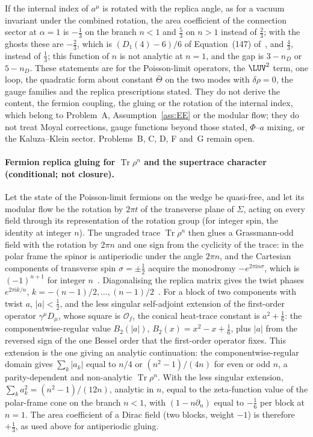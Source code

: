 If the internal index of \(a^\mu\) is rotated with the replica angle, as for a vacuum invariant under the combined rotation, the area coefficient of the connection sector at \(\alpha=1\) is \(-\tfrac13\) on the branch \(n<1\) and \(\tfrac53\) on \(n>1\) instead of \(\tfrac23\); with the ghosts these are \(-\tfrac23\), which is \((D_1(4)-6)/6\) of Equation~(147) of~\cite{Solodukhin2011}, and \(\tfrac43\), instead of \(\tfrac13\); this function of \(n\) is not analytic at \(n=1\), and the gap is \(3-n_D\) or \(5-n_D\). These statements are for the Poisson-limit operators, the \(\LUV^2\) term, one loop, the quadratic form about constant \(\bar\Theta\) on the two modes with \(\delta\rho=0\), the gauge families and the replica prescriptions stated. They do not derive the content, the fermion coupling, the gluing or the rotation of the internal index, which belong to Problem~A, Assumption~\ref{ass:EE} or the modular flow; they do not treat Moyal corrections, gauge functions beyond those stated, \(\Phi\)--\(a\) mixing, or the Kaluza--Klein sector. Problems~B, C, D, F and~G remain open.

\paragraph{Fermion replica gluing for \(\operatorname{Tr}\rho^n\) and the supertrace character (conditional; not closure).}
Let the state of the Poisson-limit fermions on the wedge be quasi-free, and let its modular flow be the rotation by \(2\pi t\) of the transverse plane of \(\Sigma\), acting on every field through its representation of the rotation group (for integer spin, the identity at integer \(n\)). The ungraded trace \(\operatorname{Tr}\rho^n\) then glues a Grassmann-odd field with the rotation by \(2\pi n\) and one sign from the cyclicity of the trace: in the polar frame the spinor is antiperiodic under the angle \(2\pi n\), and the Cartesian components of transverse spin \(\sigma=\pm\tfrac12\) acquire the monodromy \(-e^{2\pi\mathrm in\sigma}\), which is \((-1)^{n+1}\) for integer \(n\)~\cite{CasiniHuerta2009,FursaevMiele1997}. Diagonalising the replica matrix gives the twist phases \(e^{2\pi\mathrm ik/n}\), \(k=-(n-1)/2,\dots,(n-1)/2\)~\cite{CasiniHuerta2009}. For a block of two components with twist \(a\), \(|a|<\tfrac12\), and the less singular self-adjoint extension of the first-order operator \(\gamma^\mu D_\mu\), whose square is \(\mathcal O_f\), the conical heat-trace constant is \(a^2+\tfrac16\): the componentwise-regular value \(B_2(|a|)\), \(B_2(x)=x^2-x+\tfrac16\), plus \(|a|\) from the reversed sign of the one Bessel order that the first-order operator fixes. This extension is the one giving an analytic continuation: the componentwise-regular domain gives \(\sum_k|a_k|\) equal to \(n/4\) or \((n^2-1)/(4n)\) for even or odd \(n\), a parity-dependent and non-analytic \(\operatorname{Tr}\rho^n\). With the less singular extension, \(\sum_ka_k^2=(n^2-1)/(12n)\), analytic in \(n\), equal to the zeta-function value of the polar-frame cone on the branch \(n<1\), with \((1-n\partial_n)\) equal to \(-\tfrac16\) per block at \(n=1\). The area coefficient of a Dirac field (two blocks, weight \(-1\)) is therefore \(+\tfrac13\), as used above for antiperiodic gluing.

